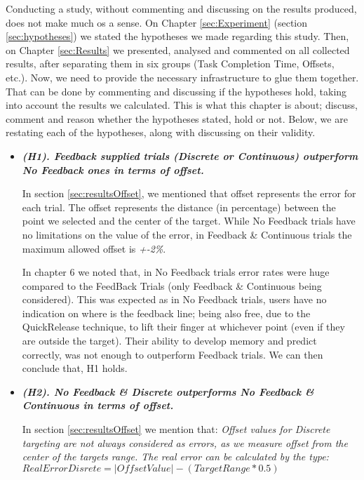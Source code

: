 
Conducting a study, without commenting and discussing on the results produced, does not make much os a sense. On Chapter \ref{sec:Experiment} (section \ref{sec:hypotheses}) we stated the hypotheses we made regarding this study. Then, on Chapter \ref{sec:Results} we presented, analysed and commented on all collected results, after separating them in six groups (Task Completion Time, Offsets, etc.). Now, we need to provide the necessary infrastructure to glue them together. That can be done by commenting and discussing if the hypotheses hold, taking into account the results we calculated. This is what this chapter is about; discuss, comment and reason whether the hypotheses stated, hold or not. Below, we are restating each of the hypotheses, along with discussing on their validity. 
 
\begin{itemize}

    \item \textbf{\textit{(H1). Feedback supplied trials (Discrete or Continuous) outperform No Feedback ones in terms of offset. }}

    In section \ref{sec:resultsOffset}, we mentioned that offset represents the error for each trial. The offset represents the distance (in percentage) between the point we selected and the center of the target. While No Feedback trials have no limitations on the value of the error, in Feedback \& Continuous trials the maximum allowed offset is \emph{+-2\%}.

    In chapter 6 we noted that, in No Feedback trials error rates were huge compared to the FeedBack Trials (only Feedback \& Continuous being considered). This was expected as in No Feedback trials, users have no indication on where is the feedback line; being also free, due to the QuickRelease technique, to lift their finger at whichever point (even if they are outside the target). Their ability to develop memory and predict correctly, was not enough to outperform Feedback trials. We can then conclude that, H1 holds.

    \item \textbf{\textit{(H2). No Feedback \& Discrete outperforms No Feedback \& Continuous in terms of offset.}}
    
    In section \ref{sec:resultsOffset} we mention that:
    \emph{Offset values for Discrete targeting are not always considered as errors, as we measure offset from the center of the targets range. The real error can be calculated by the type:}   $RealErrorDisrete = |OffsetValue| - (TargetRange*0.5)$


\end{itemize}
